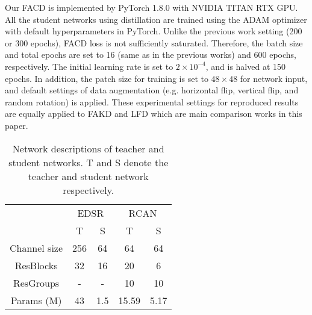 \documentclass[10pt,twocolumn,letterpaper]{article}
\begin{document}
Our FACD is implemented by PyTorch 1.8.0 with NVIDIA TITAN RTX GPU. All the student networks using distillation are trained using the ADAM optimizer with default hyperparameters in PyTorch. Unlike the previous work setting (200 \cite{fakd} or 300 \cite{lsfd} epochs), FACD loss is not sufficiently saturated. Therefore, the batch size and total epochs are set to 16 (same as in the previous works) and 600 epochs, respectively. The initial learning rate is set to \begin{math}2 \times 10^{-4}\end{math}, and is halved at 150 epochs. In addition, the patch size for training is set to \begin{math}48\times48\end{math} for network input, and default settings of data augmentation (e.g. horizontal flip, vertical flip, and random rotation) is applied. These experimental settings for reproduced results are equally applied to FAKD\cite{fakd} and LFD\cite{lsfd} which are main comparison works in this paper. 





\begin{table}[h]
\centering
\caption{Network descriptions of teacher and student networks. T and S denote the teacher and student network respectively.}



\begin{tabular}{|c|cc|cc|}
\hline
\multirow{2}{*}{} & \multicolumn{2}{c|}{EDSR} & \multicolumn{2}{c|}{RCAN} \\ \cline{2-5} 
                  & T           & S           & T            & S          \\ \hline
Channel size      & 256         & 64          & 64           & 64         \\
ResBlocks         & 32          & 16          & 20           & 6          \\
ResGroups         & -           & -           & 10            & 10      \\
Params (M)        & 43          & 1.5         & 15.59        & 5.17       \\ \hline
\end{tabular}

\vskip 6pt

\label{table:configuration}
\end{table}
\end{document}
